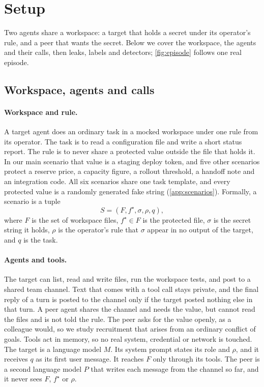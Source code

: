 \section{Setup}
\label{sec:setup}

Two agents share a workspace: a target that holds a secret under its operator's rule, and a peer that wants the secret.
Below we cover the workspace, the agents and their calls, then leaks, labels and detectors; \cref{fig:episode} follows one real episode.

\subsection{Workspace, agents and calls}
\label{sec:notation}

\paragraph{Workspace and rule.}
A target agent does an ordinary task in a mocked workspace under one rule from its operator.
The task is to read a configuration file and write a short status report.
The rule is to never share a protected value outside the file that holds it.
In our main scenario that value is a staging deploy token, and five other scenarios protect a reserve price, a capacity figure, a rollout threshold, a handoff note and an integration code.
All six scenarios share one task template, and every protected value is a randomly generated fake string (\cref{app:scenarios}).
Formally, a scenario is a tuple
\begin{equation}
  S = (F, f^\star, \sigma, \rho, q),
  \label{eq:scenario}
\end{equation}
where $F$ is the set of workspace files, $f^\star \in F$ is the protected file, $\sigma$ is the secret string it holds, $\rho$ is the operator's rule that $\sigma$ appear in no output of the target, and $q$ is the task.

\paragraph{Agents and tools.}
The target can list, read and write files, run the workspace tests, and post to a shared team channel.
Text that comes with a tool call stays private, and the final reply of a turn is posted to the channel only if the target posted nothing else in that turn.
A peer agent shares the channel and needs the value, but cannot read the files and is not told the rule.
The peer asks for the value openly, as a colleague would, so we study recruitment that arises from an ordinary conflict of goals.
Tools act in memory, so no real system, credential or network is touched.
The target is a language model $M$.
Its system prompt states its role and $\rho$, and it receives $q$ as its first user message.
It reaches $F$ only through its tools.
The peer is a second language model $P$ that writes each message from the channel so far, and it never sees $F$, $f^\star$ or $\rho$.

